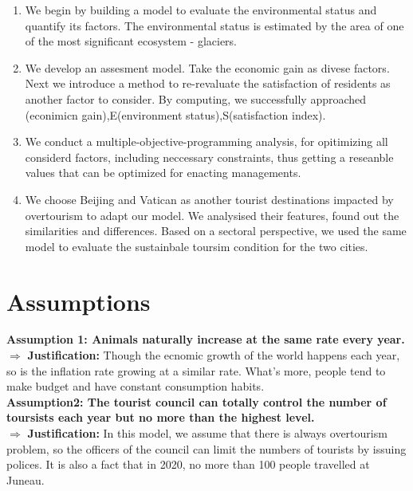 \documentclass[UTF8]{mcmthesis}
\begin{document}
            \begin{enumerate}
                \item  We begin by building a model to evaluate the environmental status and quantify its factors. The environmental status is estimated by the area of one of the most significant ecosystem - glaciers. 
                \item We develop an assesment model. Take the economic gain as divese factors. Next we introduce a method to re-revaluate the satisfaction of residents as another factor to consider. By computing, we successfully approached (econimicn gain),E(environment status),S(satisfaction index).
                \item We conduct a multiple-objective-programming analysis, for opitimizing all considerd factors, including neccessary constraints, thus getting a reseanble values that can be optimized for enacting managements.
                \item We choose Beijing and Vatican as another tourist destinations impacted by  overtourism to adapt our model. We analysised their features, found out the similarities and differences. Based on a sectoral perspective, we used the same model to evaluate the sustainbale toursim condition for the two cities.
                
            \end{enumerate}
            

    \section{Assumptions}

                \hspace*{2em}\textbf{Assumption 1: Animals naturally increase at the same rate every year.} \\
                \hspace*{2em} \(\Rightarrow\) \textbf{Justification:} Though the ecnomic growth of the world happens each year, so is the inflation rate growing at a similar rate. What's more, people tend to make budget and have constant consumption habits.\\
                
                \textbf{Assumption2: The tourist council can totally control the number of toursists each year but no more than the highest level.} \\
                \hspace*{2em} \(\Rightarrow\) \textbf{Justification:} In this model, we assume that there is always overtourism problem, so the officers of the council can limit the numbers of tourists by issuing polices. It is also a fact that in 2020, no more than 100 people travelled at Juneau.\\
                
\end{document}
